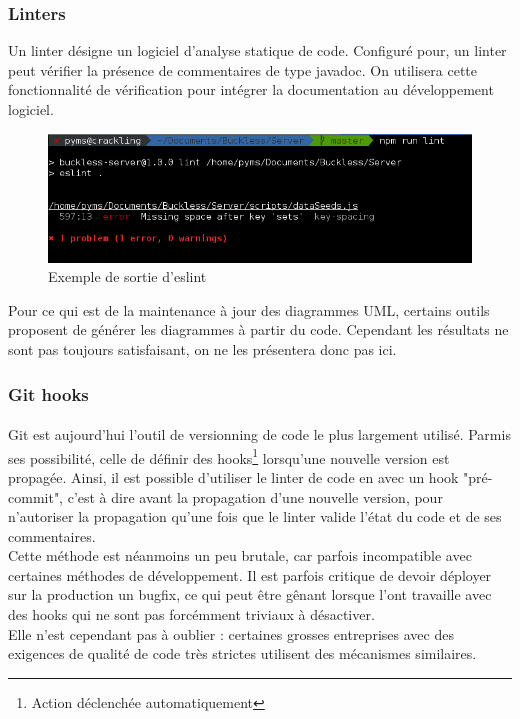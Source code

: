     \subsubsection{Linters}
        Un linter désigne un logiciel d'analyse statique de code. Configuré pour, un linter peut vérifier
        la présence de commentaires de type javadoc. On utilisera cette fonctionnalité de vérification
        pour intégrer la documentation au développement logiciel.

        \begin{figure}[ht]
            \centering
            \includegraphics[width=\textwidth]{./assets/eslint.png}
            \caption{Exemple de sortie d'eslint}
        \end{figure}

        Pour ce qui est de la maintenance à jour des diagrammes UML, certains outils proposent de générer
        les diagrammes à partir du code. Cependant les résultats ne sont pas toujours satisfaisant, on
        ne les présentera donc pas ici.

    \subsubsection{Git hooks}
        \paragraph{}
            \label{hooks}
            Git est aujourd'hui l'outil de versionning de code le plus largement utilisé. Parmis ses possibilité,
            celle de définir des hooks\footnote{Action déclenchée automatiquement} lorsqu'une nouvelle version est propagée.
            Ainsi, il est possible d'utiliser le linter de code en avec un hook "pré-commit", c'est à dire avant la
            propagation d'une nouvelle version, pour n'autoriser la propagation qu'une fois que le linter valide l'état du code et
            de ses commentaires.\\
            Cette méthode est néanmoins un peu brutale, car parfois incompatible avec certaines méthodes
            de développement. Il est parfois critique de devoir déployer sur la production un bugfix,
            ce qui peut être gênant lorsque l'ont travaille avec des hooks qui ne sont pas forcémment triviaux à désactiver.\\
            Elle n'est cependant pas à oublier : certaines grosses entreprises avec des exigences de
            qualité de code très strictes utilisent des mécanismes similaires.


